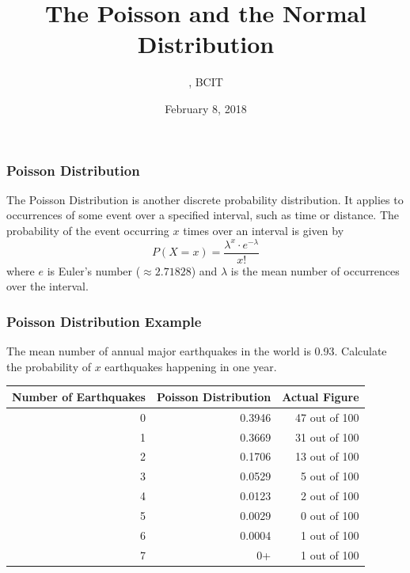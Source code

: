 \documentclass[xcolor=dvipsnames]{beamer}
\title{The Poisson and the Normal Distribution}
\subtitle{{\CourseNumber}, BCIT}
\author{\CourseName}
\date{February 8, 2018}
\begin{document}
\begin{frame}
  \titlepage
\end{frame}

\begin{frame}
  \frametitle{Poisson Distribution}
The \alert{Poisson Distribution} is another discrete probability
distribution. It applies to occurrences of some event over a specified
interval, such as time or distance. The probability of the event
occurring $x$ times over an interval is given by
\begin{equation}
  \label{eq:zaengeit}
  P(X=x)=\frac{\lambda^{x}\cdot{}e^{-\lambda}}{x!}
\end{equation}
where $e$ is Euler's number ($\approx{}2.71828$) and $\lambda$ is the mean
number of occurrences over the interval.
\end{frame}

\begin{frame}
  \frametitle{Poisson Distribution Example}
 The mean number of annual major earthquakes
in the world is 0.93. Calculate the probability of $x$ earthquakes
happening in one year.

\medskip

\begin{tabular}{|r|r|r|}\hline
  Number of Earthquakes & Poisson Distribution & Actual Figure \\ \hline 
  0                     & 0.3946               & 47 out of 100 \\ \hline
  1                     & 0.3669               & 31 out of 100 \\ \hline
  2                     & 0.1706               & 13 out of 100 \\ \hline
  3                     & 0.0529               & 5 out of 100  \\ \hline
  4                     & 0.0123               & 2 out of 100  \\ \hline
  5                     & 0.0029               & 0 out of 100  \\ \hline
  6                     & 0.0004               & 1 out of 100  \\ \hline
  7                     & 0+                   & 1 out of 100  \\ \hline
\end{tabular}
\end{frame}

\end{document}
